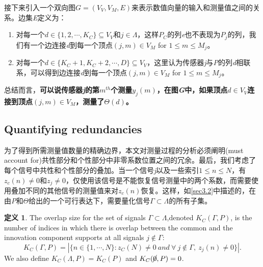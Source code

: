 \documentclass[UTF8]{ctexart}
\theoremstyle{plain}
\theoremstyle{definition}
\newtheorem{definition}{定义}[section]
\theoremstyle{remark}
\begin{document}
	接下来引入一个双向图$G=(V_V,V_M,E)$来表示数值向量的输入和测量值之间的关系。边集\emph{E}定义为：
	\begin{enumerate}
		\item 对每一个$d\in\{1,2,\cdots,K_C\}\subseteq V_V$和$j\in\Lambda$，这样$P_C$的列\emph{e}也不表现为$P_j$的列，我们有一个边连接\emph{d}到每一个顶点$(j,m)\in V_M$ for $1\leqslant m \leqslant M_j$。
		\item 对每一个$d \in \{K_C+1,K_C+2,\cdots,D\} \subseteq V_V$，这里认为传感器\emph{j}与\emph{P}的列\emph{d}相联系，可以得到边连接\emph{d}到每一个顶点$(j,m) \in V_M$ for $1 \leqslant m \leqslant M_j$。
	\end{enumerate}
	总结而言，\textcolor[rgb]{1,0,0}{\textbf{可以说传感器\emph{j}的第$m^{th}$个测量$y_j(m)$，在图\emph{G}中，如果顶点$d \in V_V$连接到顶点$(j,m)\in V_M$，测量了$\Theta(d)$。}}
	
	\subsection{Quantifying redundancies}
	为了得到所需测量值数量的精确边界，本文对测量过程的分析必须阐明(must account for)共性部分和个性部分中非零系数位置之间的冗余。最后，我们考虑了每个信号中共性和个性部分的叠加。当一个信号\emph{j}以及一些索引$1\leqslant n \leqslant N$，有$z_c(n)\neq 0$和$z_j\neq 0$，仅使用该信号是不能恢复信号测量中的两个系数，而需要使用叠加不同的其他信号的测量值来对$z_c(n)$恢复。这样，如\cref{sec3.2}中描述的，在由\emph{P}和$\Theta$给出的一个可行表达下，需要量化信号$\Gamma \subset \Lambda$的所有子集。
	\begin{definition}
		\label{def2}
		The overlap size for the set of signals $\Gamma \subset \Lambda$,denoted $K_C(\Gamma, P)$, is the number of indices in which there is overlap between the common and the innovation component supports at all signals $j \notin \Gamma$:
		\begin{equation}
		K_C(\Gamma,P)=\left|\{n \in \{1,\cdots, N\}:z_C(N)\neq 0\ and \ \forall\ j\notin \Gamma,\ z_j(n)\neq0\}\right|.
		\end{equation}	
		We also define $K_C(\Lambda,P)=K_C(P)$ and $K_C(\cancel{0},P)=0$.
	\end{definition}

	










\end{document}

